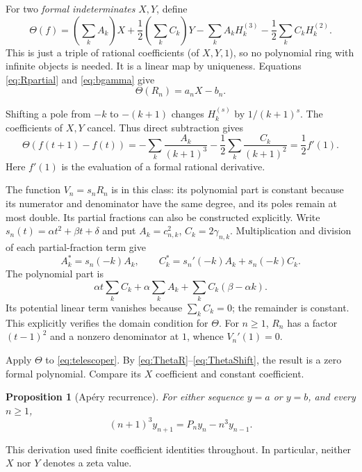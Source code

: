 \documentclass[11pt]{article}
\newtheorem{proposition}[theorem]{Proposition}
\theoremstyle{definition}\newtheorem{definition}[theorem]{Definition}
\theoremstyle{remark}\newtheorem{remark}[theorem]{Remark}
\newcommand{\HH}[2]{H_{#1}^{(#2)}}
\begin{document}
For two \emph{formal indeterminates} $X,Y$, define
\begin{equation}\label{eq:Theta}
 \Theta(f)=\left(\sum_kA_k\right)X+\frac12\left(\sum_kC_k\right)Y
 -\sum_kA_k\HH{k}{3}-\frac12\sum_kC_k\HH{k}{2}.
\end{equation}
This is just a triple of rational coefficients (of $X,Y,1$), so no polynomial
ring with infinite objects is needed. It is a linear map by uniqueness.
Equations \eqref{eq:Rpartial} and \eqref{eq:bgamma} give
\begin{equation}\label{eq:ThetaR}
 \Theta(R_n)=a_nX-b_n.
\end{equation}

Shifting a pole from $-k$ to $-(k+1)$ changes $\HH{k}{s}$ by
$1/(k+1)^s$. The coefficients of $X,Y$ cancel. Thus direct subtraction gives
\begin{equation}\label{eq:ThetaShift}
 \Theta(f(t+1)-f(t))
 =-\sum_k\frac{A_k}{(k+1)^3}-\frac12\sum_k\frac{C_k}{(k+1)^2}
 =\frac12f'(1).
\end{equation}
Here $f'(1)$ is the evaluation of a formal rational derivative.

The function $V_n=s_nR_n$ is in this class: its polynomial part is constant
because its numerator and denominator have the same degree, and its poles
remain at most double. Its partial fractions can also be constructed
explicitly. Write $s_n(t)=\alpha t^2+\beta t+\delta$ and put
$A_k=c_{n,k}^2$, $C_k=2\gamma_{n,k}$. Multiplication and division of each
partial-fraction term give
\[
 A_k^*=s_n(-k)A_k,\qquad
 C_k^*=s_n'(-k)A_k+s_n(-k)C_k.
\]
The polynomial part is
\[
 \alpha t\sum_kC_k+\alpha\sum_kA_k+
       \sum_kC_k(\beta-\alpha k).
\]
Its potential linear term vanishes because $\sum_kC_k=0$; the remainder is
constant. This explicitly verifies the domain condition for $\Theta$.
For $n\ge1$, $R_n$ has a factor $(t-1)^2$ and a nonzero denominator at $1$,
whence $V_n'(1)=0$.

Apply $\Theta$ to \eqref{eq:telescoper}. By
\eqref{eq:ThetaR}--\eqref{eq:ThetaShift}, the result is a zero formal
polynomial. Compare its $X$ coefficient and constant coefficient.

\begin{proposition}[Ap\'ery recurrence]\label{prop:recurrence}
For either sequence $y=a$ or $y=b$, and every $n\ge1$,
\begin{equation}\label{eq:recurrence}
 (n+1)^3y_{n+1}=P_ny_n-n^3y_{n-1}.
\end{equation}
\end{proposition}
This derivation used finite coefficient identities throughout. In particular,
neither $X$ nor $Y$ denotes a zeta value.
\end{document}
